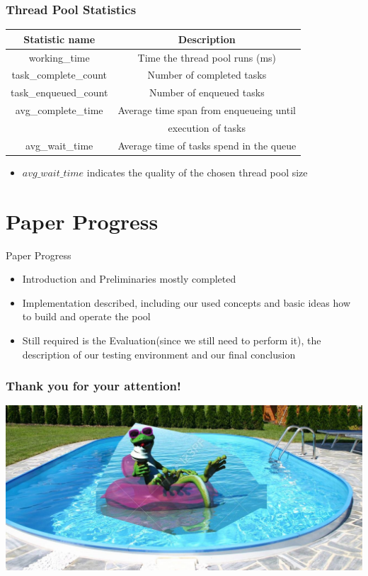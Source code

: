 \documentclass{beamer}
\begin{document}
\begin{frame}
	\frametitle{Thread Pool Statistics}
	\begin{center}
		\begin{tabular}{ c c }
			\hline
			\textbf{Statistic name}&\textbf{Description}\\
			\hline
			working\_time & Time the thread pool runs (ms) \\
			task\_complete\_count & Number of completed tasks \\
			task\_enqueued\_count & Number of enqueued tasks \\
			avg\_complete\_time & Average time span from enqueueing until \\
			& execution of tasks \\
			avg\_wait\_time & Average time of tasks spend in the queue \\
			\hline
		\end{tabular}
		\label{tab4}
	\end{center}
	\begin{itemize}
		\item $avg\_wait\_time$ indicates the quality of the chosen thread pool size
	\end{itemize}
\end{frame}

\section{Paper Progress}
\begin{frame}
	\begin{center}
	\huge Paper Progress \normalsize	
	\end{center}
\end{frame}

\begin{frame}
	\begin{itemize}
		\item Introduction and Preliminaries mostly completed
		\item Implementation described, including our used concepts and basic ideas how to build and operate the pool
		\item Still required is the Evaluation(since we still need to perform it), the description of our testing environment and our final conclusion
	\end{itemize}
\end{frame}

\begin{frame}
    \frametitle{Thank you for your attention!}
 	\includegraphics[width=\textwidth]{img/important.jpg}
\end{frame}
\end{document}
